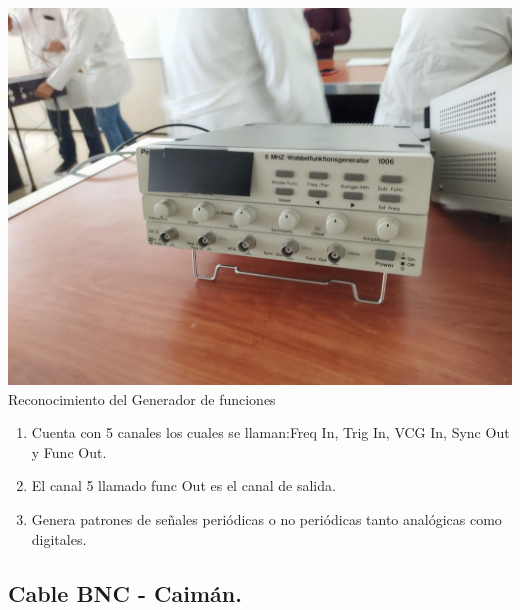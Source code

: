 \documentclass[10pt]{article}
\begin{document}
\begin{multicols}{2}
\begin{center}
\includegraphics[scale=0.1]{Imagenes/generador.png}\\
Reconocimiento del Generador de funciones
\begin{enumerate}
\item Cuenta con 5 canales los cuales se llaman:Freq In, Trig In, VCG In, Sync Out y Func Out.
\item El canal 5 llamado func Out es el canal de salida.
\item Genera patrones de señales periódicas o no periódicas tanto analógicas como digitales.
\end{enumerate}
\end{center}

\subsection{Cable BNC - Caimán.}


\end{multicols}
\end{document}
